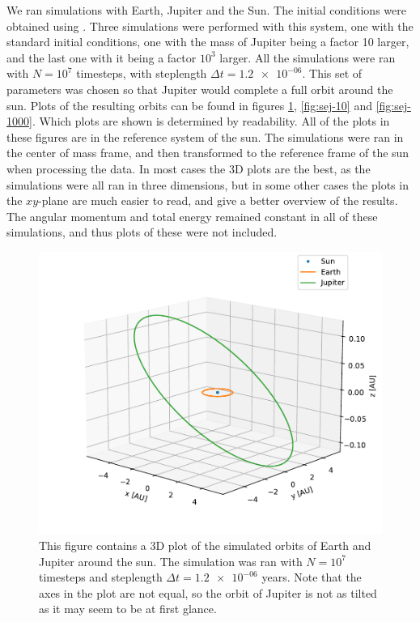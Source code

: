 \documentclass[reprint,english,notitlepage]{revtex4-1}  %
\begin{document}
We ran simulations with Earth, Jupiter and the Sun. The initial conditions were obtained using \citep{NASASolarInit}. Three simulations were performed with this system, one with the standard initial conditions, one with the mass of Jupiter being a factor 10 larger, and the last one with it being a factor $10^3$ larger. All the simulations were ran with $N=10^7$ timesteps, with steplength $\Delta t = \num{1.2e-06}$. This set of parameters was chosen so that Jupiter would complete a full orbit around the sun. Plots of the resulting orbits can be found in figures \ref{fig:sej-standard}, \ref{fig:sej-10} and \ref{fig:sej-1000}. Which plots are shown is determined by readability. All of the plots in these figures are in the reference system of the sun. The simulations were ran in the center of mass frame, and then transformed to the reference frame of the sun when processing the data. In most cases the 3D plots are the best, as the simulations were all ran in three dimensions, but in some other cases the plots in the $xy$-plane are much easier to read, and give a better overview of the results. The angular momentum and total energy remained constant in all of these simulations, and thus plots of these were not included. 

\begin{figure}[H]
\includegraphics[scale=0.5]{../data/figures/sun-earth-jupiter/sej_1xM_vv_orbit3D.pdf}
\caption{This figure contains a 3D plot of the simulated orbits of Earth and Jupiter around the sun. The simulation was ran with $N=10^7$ timesteps and steplength $\Delta t = \num{1.2e-06}$ years. Note that the axes in the plot are not equal, so the orbit of Jupiter is not as tilted as it may seem to be at first glance.}
\label{fig:sej-standard}
\end{figure}
\end{document}
